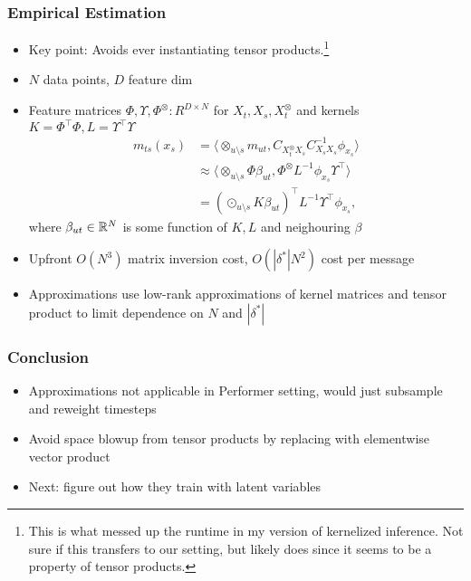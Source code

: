 \documentclass{beamer}
\begin{document}
\begin{frame}
\frametitle{Empirical Estimation}
\begin{itemize}
\item Key point: Avoids ever instantiating tensor products.\footnote{This is what messed up the runtime
    in my version of kernelized inference. Not sure if this transfers to our setting,
    but likely does since it seems to be a property of tensor products.}
\item $N$ data points, $D$ feature dim
\item Feature matrices
$\Phi, \Upsilon, \Phi^\otimes: R^{D \times N}$ for $X_t, X_s, X_t^\otimes$
and kernels $K = \Phi^\top\Phi, L = \Upsilon^\top\Upsilon$
\begin{align*}
m_{ts}(x_s)
&= \langle \otimes_{u\setminus s} m_{ut}, C_{X_t^\otimes X_s}C_{X_sX_s}^{-1}\phi_{x_s}\rangle\\
&\approx \langle \otimes_{u\setminus s} \Phi\beta_{ut},
    \Phi^\otimes L^{-1}\phi_{x_s}\Upsilon^\top\rangle\\
&= (\odot_{u\setminus s} K\beta_{ut})^\top L^{-1}\Upsilon^\top\phi_{x_s},
\end{align*}
where $\beta_{ut}\in\mathbb{R}^N$ is some function of $K,L$ and neighouring $\beta$
\item Upfront $O(N^3)$ matrix inversion cost, $O(|\delta^*|N^2)$ cost per message
\item Approximations use low-rank approximations of kernel matrices and tensor product
to limit dependence on $N$ and $|\delta^*|$
\end{itemize}
\end{frame}

\begin{frame}
\frametitle{Conclusion}
\begin{itemize}
\item Approximations not applicable in Performer setting,
    would just subsample and reweight timesteps
\vspace{2em}
\item Avoid space blowup from tensor products by replacing with elementwise
vector product
\vspace{2em}
\item Next: figure out how they train with latent variables
\end{itemize}
\end{frame}
\end{document}
